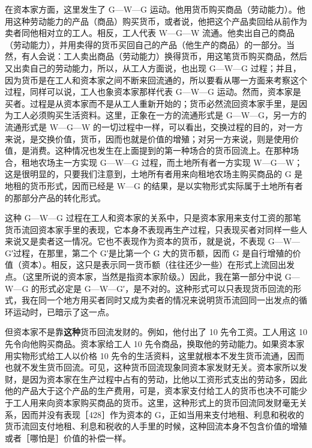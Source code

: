 在资本家方面，这里发生了 G—W—G 运动。他用货币购买商品（劳动能力）。他用这种劳动能力的产品（商品）购买货币，或者说，他把这个产品卖回给从前作为卖者同他相对立的工人。相反，工人代表 W—G—W 流通。他卖出自己的商品（劳动能力），并用卖得的货币买回自己的产品（他生产的商品）的一部分。当然，有人会说：工人卖出商品（劳动能力）换得货币，用这笔货币购买商品，然后又出卖自己的劳动能力，所以，从工人方面说，也出现 G—W—G 过程；并且，因为货币是在工人和资本家之间不断来回流通的，所以要看从哪一方面来考察这个过程，同样可以说，工人也象资本家那样代表 G—W—G 运动。然而，资本家是买者。过程是从资本家而不是从工人重新开始的；货币必然流回资本家手里，是因为工人必须购买生活资料。这里，正象在一方的流通形式是 G—W—G，另一方的流通形式是 W—G—W 的一切过程中一样，可以看出，交换过程的目的，对一方来说，是交换价值，货币，因而也就是价值的增殖；对另一方来说，则是使用价值，是消费。这种情况也发生在上面提到的第一种场合的货币回流上。在那种场合，租地农场主一方实现 G—W—G 过程，而土地所有者一方实现 W—G—W；这是很明显的，只要我们注意到，土地所有者用来向租地农场主购买商品的 G 是地租的货币形式，因而已经是 W—G 的结果，是以实物形式实际属于土地所有者的那部分产品的转化形式。

这种 G—W—G 过程在工人和资本家的关系中，只是资本家用来支付工资的那笔货币流回资本家手里的表现，它本身不表现再生产过程，只表现买者对同样一些人来说又是卖者这一情况。它也不表现作为资本的货币，就是说，不表现 G—W—G′过程，在那里，第二个 G′是比第一个 G 大的货币额，因而 G 是自行增殖的价值（资本）。相反，这只是表示同一货币额（往往还少一些）在形式上流回出发点。（这里所说的资本家，当然是指资本家阶级。）因此，我在第一部分中说 G—W—G 的形式必定是 G—W—G′，是不对的。这种形式可以只表现货币回流的形式，我在同一个地方用买者同时又成为卖者的情况来说明货币流回同一出发点的循环运动时，已暗示了这一点。

但资本家不是靠\textbf{这种}货币回流发财的。例如，他付出了 10 先令工资。工人用这 10 先令向他购买商品。资本家给工人 10 先令商品，换取他的劳动能力。如果资本家用实物形式给工人以价格 10 先令的生活资料，这里就根本不发生货币流通，因而也就不发生货币回流。可见，这种货币回流现象同资本家发财无关。资本家所以发财，是因为资本家在生产过程中占有的劳动，比他以工资形式支出的劳动多，因此他的产品大于这个产品的生产费用，可是，资本家支付给工人的货币也决不可能少于工人用来向资本家购买商品的货币。这里，这种形式上的货币回流同发财毫无关系，因而并没有表现［428］作为资本的 G，正如当用来支付地租、利息和税收的货币流回支付地租、利息和税收的人手里的时候，这种回流本身不包含价值的增殖或者［哪怕是］价值的补偿一样。

